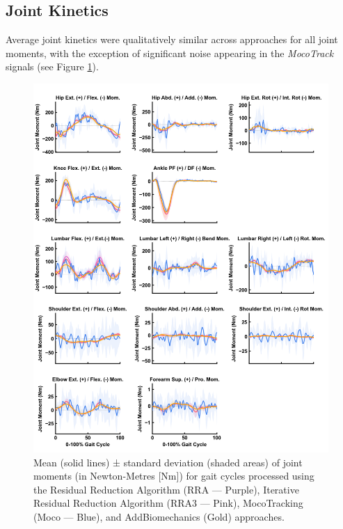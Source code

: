 \documentclass[]{elsarticle} %
\begin{document}
\hypertarget{joint-kinetics}{%
\subsection{Joint Kinetics}\label{joint-kinetics}}

Average joint kinetics were qualitatively similar across approaches for
all joint moments, with the exception of significant noise appearing in
the \emph{MocoTrack} signals (see Figure \ref{fig:jointKinetics}).

\begin{figure}

{\centering \includegraphics[width=1\linewidth]{../results/HamnerDelpDataset/figures/meanKinetics} 

}

\caption{Mean (solid lines) ± standard deviation (shaded areas) of joint moments (in Newton-Metres [Nm]) for gait cycles processed using the Residual Reduction Algorithm (RRA — Purple), Iterative Residual Reduction Algorithm  (RRA3 — Pink), MocoTracking (Moco — Blue), and AddBiomechanics (Gold) approaches.}\label{fig:jointKinetics}
\end{figure}
\end{document}

